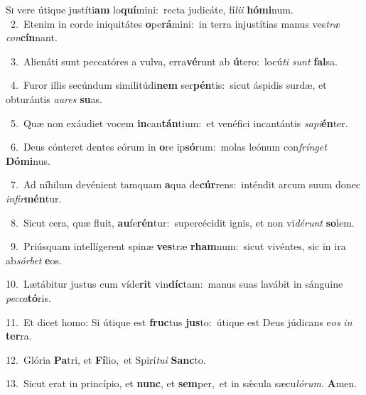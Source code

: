 \lettrine{\initial\textcolor{\initialcolor}{S}}{i} vere útique justíti\textbf{am} lo\-\textbf{quí}\-mini:~\star recta judicáte, fí\-\textit{li}\-\textit{i} \textbf{hó}\-\textbf{mi}num.\\
{\numbfont\textcolor{\numbcolor}{~2.}}~Etenim in corde iniquitátes \textbf{o}\-pe\-\textbf{rá}\-mini:~\star in terra injustítias manus ves\textit{træ} \textit{con}\-\textbf{cín}nant.\par
{\numbfont\textcolor{\numbcolor}{~3.}}~Alienáti sunt peccatóres a vulva, erra\-\textbf{vé}\-runt ab \textbf{ú}\-tero:~\star locú\textit{ti} \textit{sunt} \textbf{fal}\-sa.\par
{\numbfont\textcolor{\numbcolor}{~4.}}~Furor illis secúndum similitúdi\textbf{nem} ser\-\textbf{pén}\-tis:~\star sicut áspidis surdæ, et obturántis \textit{au}\-\textit{res} \textbf{su}\-as.\par
{\numbfont\textcolor{\numbcolor}{~5.}}~Quæ non exáudiet vocem \textbf{in}\-can\-\textbf{tán}\-tium:~\star et venéfici incantántis \textit{sa}\-\textit{pi}\textbf{én}ter.\par
{\numbfont\textcolor{\numbcolor}{~6.}}~Deus cónteret dentes eórum in \textbf{o}\-re ip\-\textbf{só}\-rum:~\star molas leónum con\-\textit{frín}\-\textit{get} \textbf{Dó}\-\textbf{mi}nus.\par
{\numbfont\textcolor{\numbcolor}{~7.}}~Ad níhilum devénient tamquam \textbf{a}\-qua de\-\textbf{cúr}\-rens:~\star inténdit arcum suum donec \textit{in}\-\textit{fir}\textbf{mén}tur.\par
{\numbfont\textcolor{\numbcolor}{~8.}}~Sicut cera, quæ fluit, \textbf{au}\-fe\-\textbf{rén}\-tur:~\star supercécidit ignis, et non vi\-\textit{dé}\-\textit{runt} \textbf{so}\-lem.\par
{\numbfont\textcolor{\numbcolor}{~9.}}~Priúsquam intellígerent spinæ \textbf{ves}\-træ \textbf{rham}\-num:~\star sicut vivéntes, sic in ira ab\-\textit{sór}\-\textit{bet} \textbf{e}\-os.\par
{\numbfont\textcolor{\numbcolor}{10.}}~Lætábitur justus cum víde\textbf{rit} vin\-\textbf{díc}\-tam:~\star manus suas lavábit in sánguine \textit{pec}\-\textit{ca}\textbf{tó}ris.\par
{\numbfont\textcolor{\numbcolor}{11.}}~Et dicet homo: Si útique est \textbf{fruc}\-tus \textbf{jus}\-to:~\star útique est Deus júdicans e\textit{os} \textit{in} \textbf{ter}\-ra.\par
{\numbfont\textcolor{\numbcolor}{12.}}~Glória \textbf{Pa}\-tri, et \textbf{Fí}\-lio,~\star et Spirí\-\textit{tu}\-\textit{i} \textbf{Sanc}\-to.\par
{\numbfont\textcolor{\numbcolor}{13.}}~Sicut erat in princípio, et \textbf{nunc}\-, et \textbf{sem}\-per,~\star et in sǽcula sæcu\-\textit{ló}\-\textit{rum}. \textbf{A}\-men.\par
